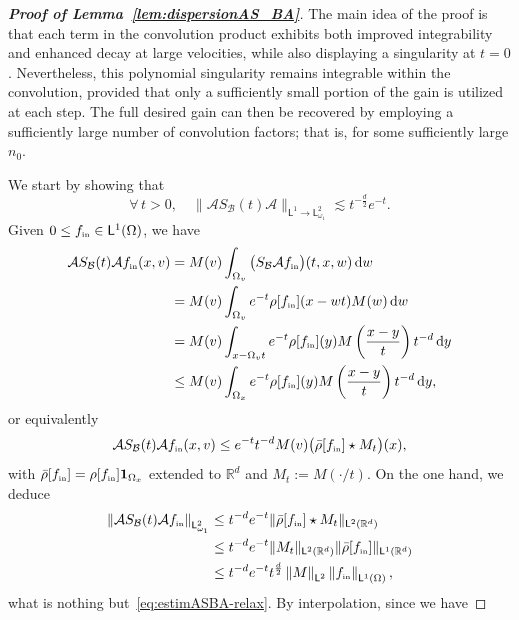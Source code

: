 \documentclass[11pt]{amsart}
\theoremstyle{definition}
\theoremstyle{remark}
\numberwithin{equation}{section}
\newcommand\R{{\mathbb R}}
\def\AA{{\mathcal A}}
\def\BB{{\mathcal B}}
\newcommand{\dd}{{\, \mathrm d}}
\newcommand{\init}{\text{{\tiny {\rm in}}}}
\newcommand{\sfL}{\mathsf{L}}
\begin{document}
\begin{proof}[{\bf Proof of Lemma~\ref{lem:dispersionAS_BA}}]
  The main idea of the proof is that each term in the convolution product exhibits both improved integrability and enhanced decay at large velocities, while also displaying a singularity at $t=0$. Nevertheless, this polynomial singularity remains integrable within the convolution, provided that only a sufficiently small portion of the gain is utilized at each step. The full desired gain can then be recovered by employing a sufficiently large number of convolution factors; that is, for some sufficiently large $n_0$.

  We start by showing that
  \begin{equation}
    \label{eq:estimASBA-relax}
    \forall \, t > 0, \quad \big\| \AA S_\BB(t) \AA \big\|_{\sfL^1  \to \sfL_{\omega_1}^2} \lesssim t^{-\frac{d}{2}}e^{-t}.
  \end{equation}
  Given $0 \le f_\init \in \sfL^{1}(\Omega)$, we have
  \begin{align*} 
    \AA S_\BB(t) \AA f_\init(x,v)
    &= M(v) \int_{\Omega_v} \big(S_\BB \AA f_\init\big)(t,x,w) \dd w\\
    &= M(v) \int_{\Omega_v} e^{-t} \rho[f_\init] (x-wt) M(w) \dd w\\
    &= M(v) \int_{x-\Omega_vt} e^{-t} \rho[f_\init] (y) M\left(\frac{x-y}{t}\right) t^{-d} \dd y\\
    &\leq M(v) \int_{\Omega_x} e^{-t} \rho[f_\init] (y) M\left(\frac{x-y}{t}\right) t^{-d} \dd y,
  \end{align*}
  or equivalently
  \begin{equation}
    \label{eq:estimASBA-relax2}
    \AA S_\BB(t) \AA f_\init(x,v) \leq e^{-t} t^{-d}  M(v) \big( \bar \rho[f_\init] \star M_t \big)(x),
  \end{equation}
  with $\bar \rho[f_\init] = \rho[f_\init] {\bf 1}_{\Omega_x}$ extended to $\R^d$ and $M_t := M(\cdot/t)$. On the one hand, we deduce
  \begin{align*}
    \left\Vert \AA S_\BB(t) \AA f_\init \right\Vert_{\sfL_{\omega_1}^2}
    &\leq t^{-d}e^{-t} \| \bar\rho[f_\init] \star M_t \|_{\sfL^2(\R^d)}  \\
    &\leq t^{-d}e^{-t}  \| M_t \|_{\sfL^2(\R^d)} \| \bar\rho[f_\init]  \|_{\sfL^1(\R^d)}  \\
    &\leq t^{-d}e^{-t} t^{\frac{d}{2}}   \left\Vert M \right\Vert_{\sfL^2} \left\Vert f_\init \right\Vert_{\sfL^1(\Omega)},
  \end{align*}
  what is nothing but~\eqref{eq:estimASBA-relax}. By interpolation, since we have

\end{proof}
\end{document}
